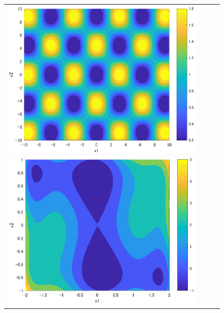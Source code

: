 \documentclass{jarticle}
\begin{document}
\begin{figure}[h]
\begin{tabular}{cccc}
\renewcommand{\thefigure}{\alph{figure}}
\begin{minipage}{0.24\hsize}
\centering
\includegraphics[width=1.0\linewidth]{eps/cont_griewank.eps}
\caption{}
\label{fig:cont_griewank}
\end{minipage} 

\begin{minipage}{0.24\hsize}
\centering
\includegraphics[width=1.0\linewidth]{eps/cont_sixhump_camel.eps}
\caption{}
\label{fig:cont_sixhump}
\end{minipage} 


\end{tabular}
\end{figure}
\end{document}

